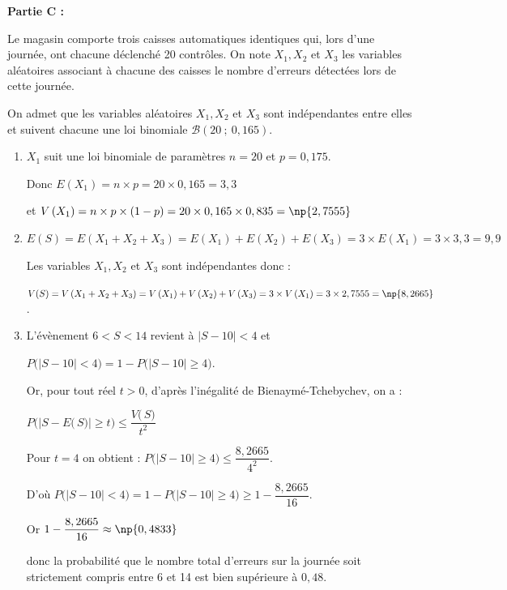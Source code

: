 \textbf{Partie C : }

Le magasin comporte trois caisses automatiques identiques qui, lors d'une journée, ont chacune déclenché 20 contrôles. On note $X_{1}, X_{2}$ et $X_{3}$ les variables aléatoires associant à chacune des caisses le nombre d'erreurs détectées lors de cette journée.

On admet que les variables aléatoires $X_{1}, X_{2}$ et $X_{3}$ sont indépendantes entre elles et suivent chacune une loi binomiale $\mathcal{B}(20~;~0,165)$.

\begin{enumerate}
\item  $X_1$ suit une loi binomiale de paramètres $n=20$ et $p=0,175$. 

Donc $E\left( X_1\right) = n\times p = 20 \times 0,165 = 3,3$ 

et $V\left( X_1\right) = n\times p \times (1-p) = 20 \times 0,165 \times 0,835 = \np{2,7555}$ 

\item $E(S)=E\left(X_{1}+X_{2}+X_{3}\right) = E\left( X_1\right) +E\left( X_2\right)+E\left( X_3\right) = 3 \times E\left( X_1\right) = 3 \times 3,3 = 9,9$ 

Les variables $X_{1}, X_{2}$ et $X_{3}$ sont indépendantes donc : 

$V(S)=V\left(X_{1}+X_{2}+X_{3}\right) = V\left( X_1\right) +V\left( X_2\right)+V\left( X_3\right) = 3 \times V\left( X_1\right) = 3 \times 2,7555 =\np{8,2665}$.
\item L'évènement \og $6 <S< 14$ \fg{} revient à $\big|S - 10\big| < 4$ et

$P\Big(\big|S- 10 \big| < 4\Big) = 1 - P\Big(\big|S - 10 \big| \geqslant 4\Big)$.

Or, pour tout réel $t>0$, d'après l'inégalité de Bienaymé-Tchebychev, on a :

$P\Big(\big|S-E\big(\,S\big)\big| \geqslant t\Big) \leqslant \dfrac{V\big(\,S\big)}{t^2}$

Pour $t = 4$ on obtient : $P\Big(\big|S-10\big| \geqslant 4\Big)\leqslant \dfrac{8,2665}{4^2}$.

D'où $P\Big(\big|S- 10 \big| < 4\Big) = 1 - P\Big(\big|S - 10 \big| \geqslant 4\Big) \geqslant 1- \dfrac{8,2665}{16}$.

Or $1 - \dfrac{8,2665}{16} \approx \np{0,4833}$

donc la probabilité que le nombre total d'erreurs sur la journée soit strictement compris entre 6 et 14 est bien supérieure à $0,48$.
\end{enumerate}
\medskip
